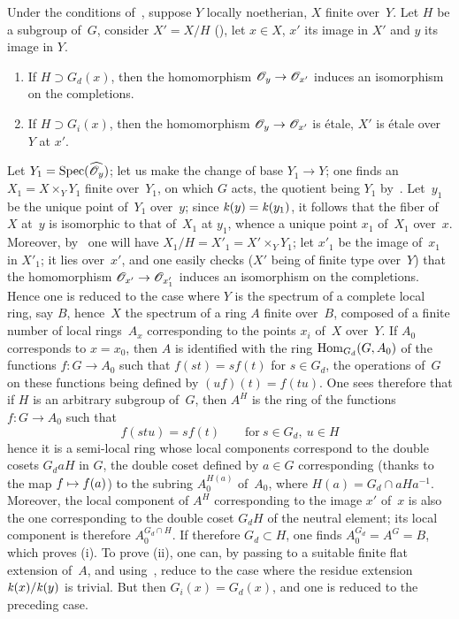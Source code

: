 \begin{proposition}
\label{V.2.2}
Under the conditions of~, suppose $Y$ locally
noetherian, $X$ finite over~$Y$. Let $H$ be a subgroup of~$G$,
consider $X'=X/H$ (\cf {}), let
$x\in X$, $x'$ its image in $X'$ and $y$ its image in $Y$.
\begin{enumerate}
\item[(i)] If $H\supset G_d(x)$, then the homomorphism
$\cal{O}_y\to\cal{O}_{x'}$ induces an isomorphism on the
completions.
\item[(ii)] If $H\supset G_i(x)$, then the homomorphism $\cal{O}_y\to
\cal{O}_{x'}$ is \'etale, \ie $X'$ is \'etale over~$Y$ at $x'$.
\end{enumerate}
\end{proposition}
Let $Y_1=\Spec(\widehat{\cal{O}_y})$; let us make the change of base
$Y_1\to Y$; one finds an $X_1=X\times_Y Y_1$ finite over~$Y_1$, on
which $G$ acts, the quotient being $Y_1$
by~. Let~$y_1$ be the unique point of~$Y_1$ over~$y$;
since
$\mathit{k}(y)=\mathit{k}(y_1)$,
it follows that the fiber of~$X$ at~$y$
is isomorphic to that of~$X_1$ at $y_1$, whence a unique point
$x_1$ of~$X_1$ over~$x$. Moreover, by~ one will have
$X_1/H=X'_1=X'\times_Y Y_1$; let $x'_1$ be the image of~$x_1$ in $X'_1$;
it lies over~$x'$, and one easily checks ($X'$ being
of finite type over~$Y$) that the homomorphism
$\cal{O}_{x'}\to\cal{O}_{x'_1}$ induces an isomorphism on the
completions. Hence one is reduced to the case where $Y$ is the
spectrum of a complete local ring, say $B$, hence~$X$ the spectrum of a
ring $A$ finite over~$B$, composed of a finite number of local rings~$A_x$ corresponding
to the points $x_i$ of~$X$ over~$Y$. If $A_0$ corresponds to $x=x_0$,
then $A$ is identified with the ring $\operatorname{Hom}_{G_d}(G,A_0)$ of the functions
$f\colon G\to A_0$ such that $f(st)=sf(t)$ for $s\in G_d$, the
operations of~$G$ on these functions being defined by
$(uf)(t)=f(tu)$. One sees therefore that if $H$ is an arbitrary subgroup
of~$G$, then $A^H$ is the ring of the functions $f\colon G\to A_0$
such that
$$
f(stu)=sf(t)\qquad\text{for}\ s\in G_d,\ u\in H
$$
hence it is a semi-local ring whose local components
correspond to the double cosets $G_daH$ in $G$, the double
coset defined by $a\in G$ corresponding (thanks to
the map $f\mto f(a)$) to the subring $A_0^{H(a)}$ of~$A_0$,
where $H(a)=G_d\cap aHa^{-1}$. Moreover, the local component of
$A^H$ corresponding to the image $x'$ of~$x$ is also the one
corresponding to the double coset $G_dH$ of the neutral
element; its local component is therefore $A_0^{G_d\cap H}$. If therefore
$G_d\subset H$,
one finds $A_0^{G_d}=A^G=B$, which proves (i). To
prove (ii), one can, by passing to a suitable finite flat
extension of~$A$, and using~, reduce to the case where
the residue extension
$\mathit{k}(x)/\mathit{k}(y)$
is trivial. But
then $G_i(x)=G_d(x)$, and one is reduced to the preceding case.

